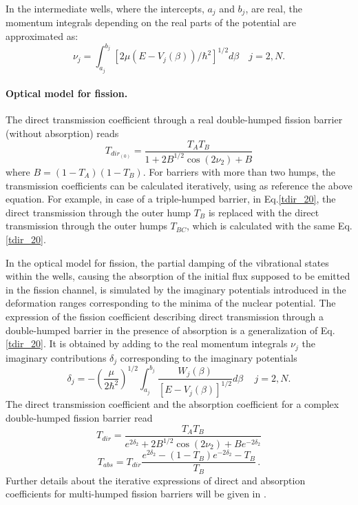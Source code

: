 \documentclass[twocolumn,amsmath,amssymb,10pt,groupedaddress,a4paper]{revtex4}
\begin{document}
In the intermediate wells, where the intercepts, $a_{j}$ and $b_{j}$, are real,
the momentum integrals depending on the real parts of the potential are
approximated as:
\begin{equation}
\nu_{j}=\int_{a_{j}}^{b_{j}}[2\mu(E-V_{j}(\beta))/\hbar^{2}]^{1/2}d\beta\quad
j=2,N.
\end{equation}

\paragraph*{Optical model for fission.}
%
The direct transmission coefficient through a real double-humped fission barrier
(without absorption) reads~\cite{Bhandari:79}
%
\begin{equation}
T_{dir_{(0)}}=\frac{T_{A}T_{B}}{1+2B^{1/2}\cos (2\nu_{2})+B}
\label{tdir_20}%
\end{equation}%
%
where $B=(1-T_{A})(1-T_{B})$. For barriers with more than two humps, the transmission
coefficients can be calculated iteratively, using as reference the above equation.
For example, in case of a triple-humped barrier, in Eq.\ref{tdir_20}, the direct
transmission through the outer hump $T_B$  is replaced with the direct
transmission through the outer humps $T_{BC}$, which is calculated with the same
Eq.\ref{tdir_20}.


In the optical model for fission, the partial damping of the vibrational states
within the wells, causing the absorption of the initial flux supposed to be emitted
in the fission channel, is simulated by the imaginary potentials introduced in the
deformation ranges corresponding to the minima of the nuclear potential.
The expression of the fission coefficient describing direct transmission through a
double-humped barrier in the presence of absorption is a generalization of Eq.\ref{tdir_20}.
It is obtained by adding to the real momentum integrals $\nu_j$ the imaginary contributions
$\delta_j$ corresponding to the imaginary potentials  \cite{Bhandari:79}
%
\begin{equation}
\delta_j=-\left(  \frac{\mu}{2\hbar^{2}}\right)  ^{1/2}\int_{a_{j}}^{b_{j}%
}\frac{W_j(\beta)}{[E-V_{j}(\beta)]^{1/2}}d\beta\,\quad
j=2,N.
\end{equation}
%
The direct transmission coefficient and the absorption coefficient for a complex double-humped
fission barrier read
%
\begin{equation}
T_{dir}=\frac{T_{A}T_{B}}{e^{2\delta_2}+2B^{1/2}\cos
(2\nu_{2})+Be^{-2\delta_2}} \label{tdir_2}%
\end{equation}
%
%
\begin{equation}
T_{abs}=T_{dir}\frac{e^{2\delta_2}-(1-T_{B})e^{-2\delta_2}-T_{B}}{T_{B}}\,.
\label{tabs_2}%
\end{equation}
%
Further details about the iterative expressions of direct and absorption coefficients for
multi-humped fission barriers will be given in \cite{Sin:07}.
\end{document}
